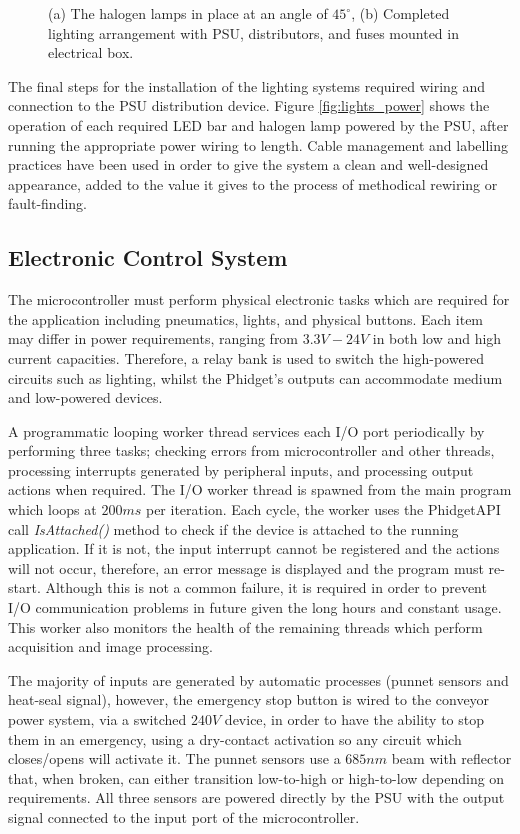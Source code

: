 \documentclass[fleqn,twoside,12pt]{report}
\begin{document}
\begin{figure}[ht]
	\caption{(a) The halogen lamps in place at an angle of $45^{\circ}$, (b) Completed lighting arrangement with PSU, distributors, and fuses mounted in electrical box.}
	\label{}
\end{figure}


The final steps for the installation of the lighting systems required wiring and connection to the PSU distribution device. Figure \ref{fig:lights_power} shows the operation of each required LED bar and halogen lamp powered by the PSU, after running the appropriate power wiring to length. Cable management and labelling practices have been used in order to give the system a clean and well-designed appearance, added to the value it gives to the process of methodical rewiring or fault-finding.



\subsection{Electronic Control System}


The microcontroller must perform physical electronic tasks which are required for the application including pneumatics, lights, and physical buttons. Each item may differ in power requirements, ranging from $3.3V-24V$ in both low and high current capacities. Therefore, a relay bank is used to switch the high-powered circuits such as lighting, whilst the Phidget\texttrademark's outputs can accommodate medium and low-powered devices. 


A programmatic looping worker thread services each I/O port periodically by performing three tasks; checking errors from microcontroller and other threads, processing interrupts generated by peripheral inputs, and processing output actions when required. The I/O worker thread is spawned from the main program which loops at $200ms$ per iteration. Each cycle, the worker uses the Phidget\texttrademark API call \textit{IsAttached()} method to check if the device is attached to the running application. If it is not, the input interrupt cannot be registered and the actions will not occur, therefore, an error message is displayed and the program must re-start. Although this is not a common failure, it is required in order to prevent I/O communication problems in future given the long hours and constant usage. This worker also monitors the health of the remaining threads which perform acquisition and image processing. 

The majority of inputs are generated by automatic processes (punnet sensors and heat-seal signal), however, the emergency stop button is wired to the conveyor power system, via a switched $240V$ device, in order to have the ability to stop them in an emergency, using a dry-contact activation so any circuit which closes/opens will activate it. The punnet sensors use a $685nm$ beam with reflector that, when broken, can either transition low-to-high or high-to-low depending on requirements. All three sensors are powered directly by the PSU with the output signal connected to the input port of the microcontroller. 
\end{document}
